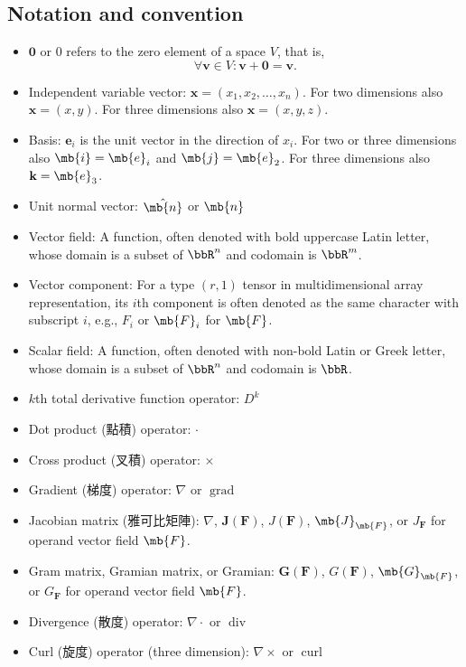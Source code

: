 \documentclass[a4paper,12pt]{report}
\begin{document}
\begin{itemize}
\begin{itemize}
\subsection{Notation and convention}
\begin{itemize}
\item $\mathbf{0}$ or $0$ refers to the zero element of a space $V$, that is, 
\[\forall\mathbf{v}\in V\colon\mathbf{v}+\mathbf{0}=\mathbf{v}.\]
\item Independent variable vector: $\mathbf{x}=(x_1,x_2,\dots,x_n)$. For two dimensions also $\mathbf{x}=(x,y)$. For three dimensions also $\mathbf{x}=(x,y,z)$.
\item Basis: $\mathbf{e}_i$ is the unit vector in the direction of $x_i$. For two or three dimensions also $\mb{i}=\mb{e}_i$ and $\mb{j}=\mb{e}_2$. For three dimensions also $\mathbf{k}=\mb{e}_3$.
\item Unit normal vector: $\hat{\mb{n}}$ or $\mb{n}$
\item Vector field: A function, often denoted with bold uppercase Latin letter, whose domain is a subset of $\bbR^n$ and codomain is $\bbR^m$.
\item Vector component: For a type $(r,1)$ tensor in multidimensional array representation, its $i$th component is often denoted as the same character with subscript $i$, e.g., $F_i$ or $\mb{F}_i$ for $\mb{F}$.
\item Scalar field: A function, often denoted with non-bold Latin or Greek letter, whose domain is a subset of $\bbR^n$ and codomain is $\bbR$.
\item $k$th total derivative function operator: $D^k$
\item Dot product (點積) operator: $\cdot$
\item Cross product (叉積) operator: $\times$
\item Gradient (梯度) operator: $\nabla$ or $\operatorname{grad}$
\item Jacobian matrix (雅可比矩陣): $\nabla$, $\mathbf{J}(\mathbf{F})$, $J(\mathbf{F})$, $\mb{J}_{\mb{F}}$, or $J_{\mathbf{F}}$ for operand vector field $\mb{F}$.
\item Gram matrix, Gramian matrix, or Gramian: $\mathbf{G}(\mathbf{F})$, $G(\mathbf{F})$, $\mb{G}_{\mb{F}}$, or $G_{\mathbf{F}}$ for operand vector field $\mb{F}$.
\item Divergence (散度) operator: $\nabla \cdot$ or $\operatorname{div}$
\item Curl (旋度) operator (three dimension): $\nabla\times$ or $\operatorname{curl}$

\end{itemize}
\end{itemize}
\end{itemize}
\end{document}
